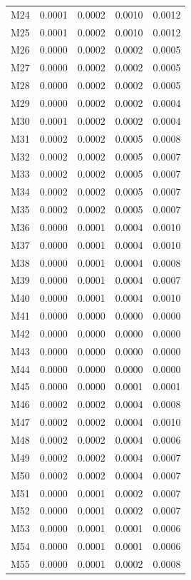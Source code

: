 \begin{longtable}{lrrrr}
M24 & 0.0001 & 0.0002 & 0.0010 & 0.0012 \\
M25 & 0.0001 & 0.0002 & 0.0010 & 0.0012 \\
M26 & 0.0000 & 0.0002 & 0.0002 & 0.0005 \\
M27 & 0.0000 & 0.0002 & 0.0002 & 0.0005 \\
M28 & 0.0000 & 0.0002 & 0.0002 & 0.0005 \\
M29 & 0.0000 & 0.0002 & 0.0002 & 0.0004 \\
M30 & 0.0001 & 0.0002 & 0.0002 & 0.0004 \\
M31 & 0.0002 & 0.0002 & 0.0005 & 0.0008 \\
M32 & 0.0002 & 0.0002 & 0.0005 & 0.0007 \\
M33 & 0.0002 & 0.0002 & 0.0005 & 0.0007 \\
M34 & 0.0002 & 0.0002 & 0.0005 & 0.0007 \\
M35 & 0.0002 & 0.0002 & 0.0005 & 0.0007 \\
M36 & 0.0000 & 0.0001 & 0.0004 & 0.0010 \\
M37 & 0.0000 & 0.0001 & 0.0004 & 0.0010 \\
M38 & 0.0000 & 0.0001 & 0.0004 & 0.0008 \\
M39 & 0.0000 & 0.0001 & 0.0004 & 0.0007 \\
M40 & 0.0000 & 0.0001 & 0.0004 & 0.0010 \\
M41 & 0.0000 & 0.0000 & 0.0000 & 0.0000 \\
M42 & 0.0000 & 0.0000 & 0.0000 & 0.0000 \\
M43 & 0.0000 & 0.0000 & 0.0000 & 0.0000 \\
M44 & 0.0000 & 0.0000 & 0.0000 & 0.0000 \\
M45 & 0.0000 & 0.0000 & 0.0001 & 0.0001 \\
M46 & 0.0002 & 0.0002 & 0.0004 & 0.0008 \\
M47 & 0.0002 & 0.0002 & 0.0004 & 0.0010 \\
M48 & 0.0002 & 0.0002 & 0.0004 & 0.0006 \\
M49 & 0.0002 & 0.0002 & 0.0004 & 0.0007 \\
M50 & 0.0002 & 0.0002 & 0.0004 & 0.0007 \\
M51 & 0.0000 & 0.0001 & 0.0002 & 0.0007 \\
M52 & 0.0000 & 0.0001 & 0.0002 & 0.0007 \\
M53 & 0.0000 & 0.0001 & 0.0001 & 0.0006 \\
M54 & 0.0000 & 0.0001 & 0.0001 & 0.0006 \\
M55 & 0.0000 & 0.0001 & 0.0002 & 0.0008 \\

\end{longtable}
